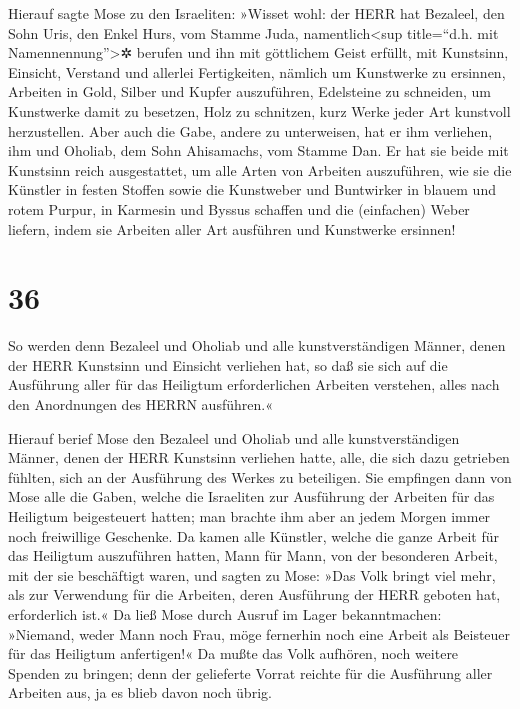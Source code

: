  Hierauf sagte Mose zu den Israeliten: »Wisset wohl: der
HERR hat Bezaleel, den Sohn Uris, den Enkel Hurs, vom Stamme Juda,
namentlich\textless sup title=``d.h. mit Namennennung''\textgreater✲
berufen  und ihn mit göttlichem Geist erfüllt, mit
Kunstsinn, Einsicht, Verstand und allerlei Fertigkeiten, 
nämlich um Kunstwerke zu ersinnen, Arbeiten in Gold, Silber und Kupfer
auszuführen,  Edelsteine zu schneiden, um Kunstwerke
damit zu besetzen, Holz zu schnitzen, kurz Werke jeder Art kunstvoll
herzustellen.  Aber auch die Gabe, andere zu unterweisen,
hat er ihm verliehen, ihm und Oholiab, dem Sohn Ahisamachs, vom Stamme
Dan.  Er hat sie beide mit Kunstsinn reich ausgestattet,
um alle Arten von Arbeiten auszuführen, wie sie die Künstler in festen
Stoffen sowie die Kunstweber und Buntwirker in blauem und rotem Purpur,
in Karmesin und Byssus schaffen und die (einfachen) Weber liefern, indem
sie Arbeiten aller Art ausführen und Kunstwerke ersinnen!

\hypertarget{section-35}{%
\section{36}\label{section-35}}

 So werden denn Bezaleel und Oholiab und alle
kunstverständigen Männer, denen der HERR Kunstsinn und Einsicht
verliehen hat, so daß sie sich auf die Ausführung aller für das
Heiligtum erforderlichen Arbeiten verstehen, alles nach den Anordnungen
des HERRN ausführen.«

 Hierauf berief Mose den Bezaleel und Oholiab und alle
kunstverständigen Männer, denen der HERR Kunstsinn verliehen hatte,
alle, die sich dazu getrieben fühlten, sich an der Ausführung des Werkes
zu beteiligen.  Sie empfingen dann von Mose alle die
Gaben, welche die Israeliten zur Ausführung der Arbeiten für das
Heiligtum beigesteuert hatten; man brachte ihm aber an jedem Morgen
immer noch freiwillige Geschenke.  Da kamen alle Künstler,
welche die ganze Arbeit für das Heiligtum auszuführen hatten, Mann für
Mann, von der besonderen Arbeit, mit der sie beschäftigt waren,
 und sagten zu Mose: »Das Volk bringt viel mehr, als zur
Verwendung für die Arbeiten, deren Ausführung der HERR geboten hat,
erforderlich ist.«  Da ließ Mose durch Ausruf im Lager
bekanntmachen: »Niemand, weder Mann noch Frau, möge fernerhin noch eine
Arbeit als Beisteuer für das Heiligtum anfertigen!« Da mußte das Volk
aufhören, noch weitere Spenden zu bringen;  denn der
gelieferte Vorrat reichte für die Ausführung aller Arbeiten aus, ja es
blieb davon noch übrig.

